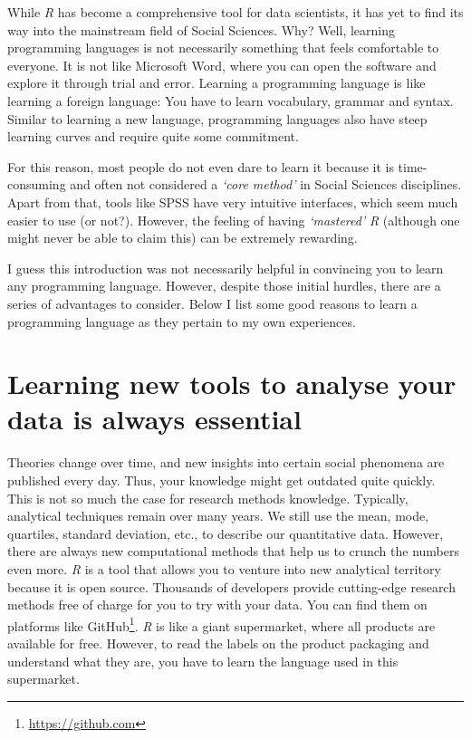 \documentclass[
  letterpaper,
]{krantz}
\renewcommand{\href}[2]{#2\footnote{\url{#1}}}
\begin{document}
While \emph{R} has become a comprehensive tool for data scientists, it
has yet to find its way into the mainstream field of Social Sciences.
Why? Well, learning programming languages is not necessarily something
that feels comfortable to everyone. It is not like Microsoft Word, where
you can open the software and explore it through trial and error.
Learning a programming language is like learning a foreign language: You
have to learn vocabulary, grammar and syntax. Similar to learning a new
language, programming languages also have steep learning curves and
require quite some commitment.

For this reason, most people do not even dare to learn it because it is
time-consuming and often not considered a \emph{`core method'} in Social
Sciences disciplines. Apart from that, tools like SPSS have very
intuitive interfaces, which seem much easier to use (or not?). However,
the feeling of having \emph{`mastered'} \emph{R} (although one might
never be able to claim this) can be extremely rewarding.

I guess this introduction was not necessarily helpful in convincing you
to learn any programming language. However, despite those initial
hurdles, there are a series of advantages to consider. Below I list some
good reasons to learn a programming language as they pertain to my own
experiences.

\section{Learning new tools to analyse your data is always
essential}\label{learning-new-tools-to-analyse-your-data-is-always-essential}

Theories change over time, and new insights into certain social
phenomena are published every day. Thus, your knowledge might get
outdated quite quickly. This is not so much the case for research
methods knowledge. Typically, analytical techniques remain over many
years. We still use the mean, mode, quartiles, standard deviation, etc.,
to describe our quantitative data. However, there are always new
computational methods that help us to crunch the numbers even more.
\emph{R} is a tool that allows you to venture into new analytical
territory because it is open source. Thousands of developers provide
cutting-edge research methods free of charge for you to try with your
data. You can find them on platforms like
\href{https://github.com}{GitHub}. \emph{R} is like a giant supermarket,
where all products are available for free. However, to read the labels
on the product packaging and understand what they are, you have to learn
the language used in this supermarket.
\end{document}
